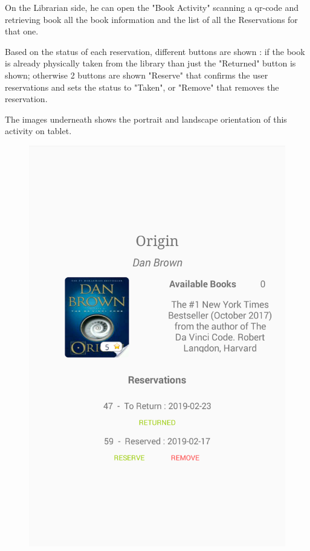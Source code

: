 \newpage
{}
On the Librarian side, he can open the "Book Activity" scanning a qr-code and retrieving book all the book information and the list of all the Reservations for that one.\par
Based on the status of each reservation, different buttons are shown : if the book is already physically taken from the library than just the "Returned" button is shown; otherwise 2 buttons are shown "Reserve" that confirms the user reservations and sets the status to "Taken", or "Remove" that removes the reservation.\par
The images underneath shows the portrait and landscape orientation of this activity on tablet.
\vspace*{1cm}
\begin{figure}[H]
	\centering
	\includegraphics[scale=0.2]{Images/UI/Librarian/1}

\end{figure}

